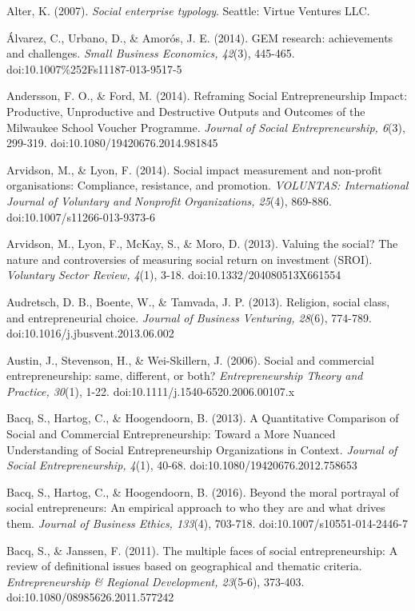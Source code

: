 \documentclass{article}
\begin{document}
Alter, K. (2007). \emph{Social enterprise typology}. Seattle: Virtue Ventures LLC. 

Álvarez, C., Urbano, D., \& Amorós, J. E. (2014). GEM research: achievements and challenges. \emph{Small Business Economics, 42}(3), 445-465. doi:10.1007\%252Fs11187-013-9517-5

Andersson, F. O., \& Ford, M. (2014). Reframing Social Entrepreneurship Impact: Productive, Unproductive and Destructive Outputs and Outcomes of the Milwaukee School Voucher Programme. \emph{Journal of Social Entrepreneurship, 6}(3), 299-319. doi:10.1080/19420676.2014.981845

Arvidson, M., \& Lyon, F. (2014). Social impact measurement and non-profit organisations: Compliance, resistance, and promotion. \emph{VOLUNTAS: International Journal of Voluntary and }\emph{Nonprofit}\emph{ Organizations, 25}(4), 869-886. doi:10.1007/s11266-013-9373-6

Arvidson, M., Lyon, F., McKay, S., \& Moro, D. (2013). Valuing the social? The nature and controversies of measuring social return on investment (SROI). \emph{Voluntary Sector Review, 4}(1), 3-18. doi:10.1332/204080513X661554

Audretsch, D. B., Boente, W., \& Tamvada, J. P. (2013). Religion, social class, and entrepreneurial choice. \emph{Journal of Business Venturing, 28}(6), 774-789. doi:10.1016/j.jbusvent.2013.06.002

Austin, J., Stevenson, H., \& Wei-Skillern, J. (2006). Social and commercial entrepreneurship: same, different, or both? \emph{Entrepreneurship Theory and Practice, 30}(1), 1-22. doi:10.1111/j.1540-6520.2006.00107.x

Bacq, S., Hartog, C., \& Hoogendoorn, B. (2013). A Quantitative Comparison of Social and Commercial Entrepreneurship: Toward a More Nuanced Understanding of Social Entrepreneurship Organizations in Context. \emph{Journal of Social Entrepreneurship, 4}(1), 40-68. doi:10.1080/19420676.2012.758653

Bacq, S., Hartog, C., \& Hoogendoorn, B. (2016). Beyond the moral portrayal of social entrepreneurs: An empirical approach to who they are and what drives them. \emph{Journal of Business Ethics, 133}(4), 703-718. doi:10.1007/s10551-014-2446-7

Bacq, S., \& Janssen, F. (2011). The multiple faces of social entrepreneurship: A review of definitional issues based on geographical and thematic criteria. \emph{Entrepreneurship \& Regional Development, 23}(5-6), 373-403. doi:10.1080/08985626.2011.577242
\end{document}
